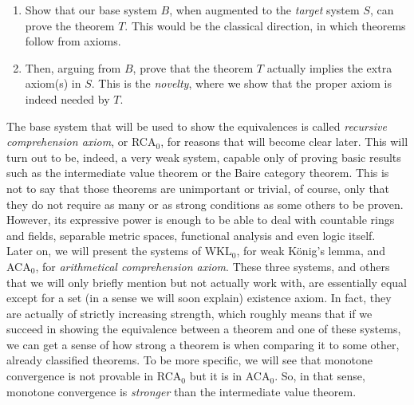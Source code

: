 \documentclass[../main.tex]{book}
\begin{document}
\begin{enumerate}
\item Show that our base system $B$, when augmented to the \textit{target} system $S$, can prove the theorem $T$. This would be the classical direction, in which theorems follow from axioms.
\item Then, arguing from $B$, prove that the theorem $T$ actually implies the extra axiom(s) in $S$. This is the \textit{novelty}, where we show that the proper axiom is indeed needed by $T$.
\end{enumerate}

The base system that will be used to show the equivalences is called \textit{recursive comprehension axiom}, or RCA$_0$, for reasons that will become clear later. This will turn out to be, indeed, a very weak system, capable only of proving basic results such as the intermediate value theorem or the Baire category theorem. This is not to say that those theorems are unimportant or trivial, of course, only that they do not require as many or as strong conditions as some others to be proven. However, its expressive power is enough to be able to deal with countable rings and fields, separable metric spaces, functional analysis and even logic itself. \\

Later on, we will present the systems of WKL$_0$, for weak König's lemma, and ACA$_0$, for \textit{arithmetical comprehension axiom}. These three systems, and others that we will only briefly mention but not actually work with, are essentially equal except for a set (in a sense we will soon explain) existence axiom. In fact, they are actually of strictly increasing strength, which roughly means that if we succeed in showing the equivalence between a theorem and one of these systems, we can get a sense of how strong a theorem is when comparing it to some other, already classified theorems. To be more specific, we will see that monotone convergence is not provable in RCA$_0$ but it is in ACA$_0$. So, in that sense, monotone convergence is \textit{stronger} than the intermediate value theorem.
\end{document}
